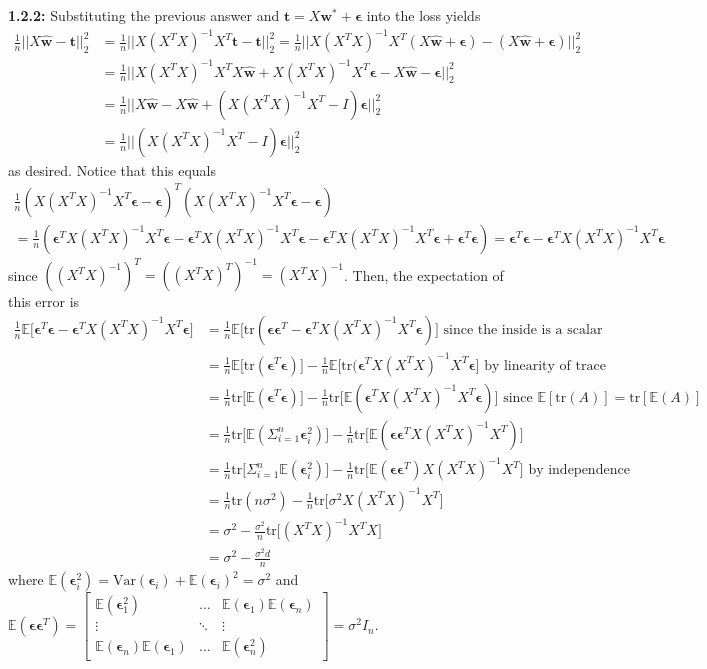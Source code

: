 \documentclass[12pt]{article}
\newcommand{\E}{\mathbb{E}}
\newcommand{\m}[1]{\mathbf{#1}}
\newcommand{\mhat}[1]{\hat{\mathbf{#1}}}
\newcommand{\mep}{\boldsymbol{\epsilon}}
\newcommand{\tr}{\text{tr}}
\begin{document}
\textbf{1.2.2:} Substituting the previous answer and $\m t = X\m w^* + \mep$ into the loss yields
\begin{align*}
    \frac{1}{n}||X\mhat w - \m t||^2_2 &= \frac{1}{n}||X(X^T X)^{-1}X^T\m t - \m t||^2_2 = \frac{1}{n}||X(X^T X)^{-1}X^T (X\mhat w + \mep) - (X\mhat w + \mep)||^2_2\\
    &= \frac{1}{n}||X(X^T X)^{-1}X^T X\mhat w + X(X^T X)^{-1}X^T\mep - X\mhat w - \mep||^2_2\\
    &= \frac{1}{n}||X\mhat w - X\mhat w + (X(X^T X)^{-1}X^T - I)\mep||^2_2\\
    &= \frac{1}{n}||(X(X^T X)^{-1}X^T - I)\mep||^2_2
\end{align*} as desired. Notice that this equals
\begin{multline*}
    \frac{1}{n}(X(X^T X)^{-1}X^T\mep - \mep)^T(X(X^T X)^{-1}X^T\mep - \mep) \\ = \frac{1}{n}(\mep^T X(X^T X)^{-1}X^T\mep - \mep^T X(X^T X)^{-1}X^T\mep - \mep^T X(X^T X)^{-1}X^T\mep + \mep^T\mep) = \mep^T\mep - \mep^T X(X^T X)^{-1}X^T\mep
\end{multline*} since $((X^T X)^{-1})^T = ((X^T X)^T)^{-1} = (X^T X)^{-1}$. Then, the expectation of this error is
\begin{align*}
    \frac{1}{n}\E\Big[\mep^T\mep - \mep^T X(X^T X)^{-1}X^T\mep\Big] &= \frac{1}{n}\E\Big[\tr(\mep\mep^T - \mep^T X(X^T X)^{-1}X^T\mep)\Big] \text{ since the inside is a scalar}\\
    &= \frac{1}{n}\E\Big[\tr(\mep^T\mep)\Big] - \frac{1}{n}\E\Big[\tr(\mep^T X(X^T X)^{-1}X^T\mep\Big] \text{ by linearity of trace}\\
    &= \frac{1}{n}\tr\Big[\E(\mep^T\mep)\Big] - \frac{1}{n}\tr\Big[\E(\mep^T X(X^T X)^{-1}X^T\mep)\Big] \text{ since }\E[\tr(A)] = \tr[\E(A)]\\
    &= \frac{1}{n}\tr\Big[\E(\Sigma_{i=1}^n \mep^2_i)\Big] - \frac{1}{n}\tr\Big[\E(\mep\mep^T X(X^T X)^{-1}X^T)\Big]\\
    &= \frac{1}{n}\tr\Big[\Sigma_{i=1}^n\E(\mep^2_i)\Big] - \frac{1}{n}\tr\Big[\E(\mep\mep^T) X(X^T X)^{-1}X^T\Big] \text{ by independence}\\
    &= \frac{1}{n}\tr(n\sigma^2) - \frac{1}{n}\tr\Big[\sigma^2 X(X^T X)^{-1}X^T\Big]\\
    &= \sigma^2 - \frac{\sigma^2}{n}\tr\Big[(X^T X)^{-1}X^T X\Big]\\
    &= \sigma^2 - \frac{\sigma^2 d}{n}
\end{align*} where $\E(\mep^2_i) = \text{Var}(\mep_i) + \E(\mep_i)^2 = \sigma^2$ and $\E(\mep\mep^T) = \begin{bmatrix} \E(\mep^2_1) & \dots & \E(\mep_1)\E(\mep_n) \\ \vdots & \ddots & \vdots \\ \E(\mep_n)\E(\mep_1) & \dots & \E(\mep^2_n) \end{bmatrix} = \sigma^2 I_n$.
\end{document}
